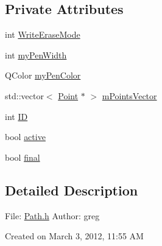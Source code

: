 \subsection*{Private Attributes}
\begin{DoxyCompactItemize}
\item 
int \hyperlink{classPath_ae2d6268c79888176aece5b76350810a2}{WriteEraseMode}
\item 
int \hyperlink{classPath_aaa655eaed9bc76b4be7a83e798cafdc4}{myPenWidth}
\item 
QColor \hyperlink{classPath_aa4957231df4c43c1dff18df7caa4f0d8}{myPenColor}
\item 
std::vector$<$ \hyperlink{classPoint}{Point} $\ast$ $>$ \hyperlink{classPath_a88b86252aa1a027b0417a8d5a2dc3f2d}{mPointsVector}
\item 
int \hyperlink{classPath_a5c1880b5bc26ef03c335687c6edd7921}{ID}
\item 
bool \hyperlink{classPath_a80d925a5ed65133cd0e96bc2a10a2d3c}{active}
\item 
bool \hyperlink{classPath_a657da9ea45a6b01a77c7b5442cace564}{final}
\end{DoxyCompactItemize}


\subsection{Detailed Description}
File: \hyperlink{Path_8h}{Path.h} Author: greg

Created on March 3, 2012, 11:55 AM 

